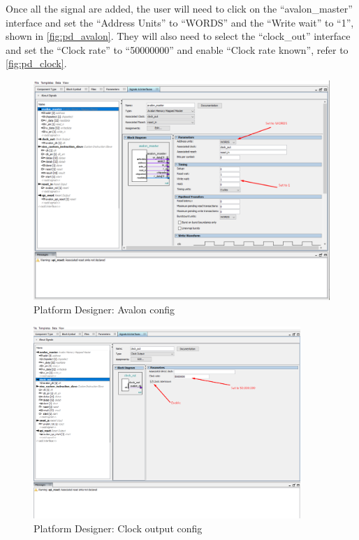 Once all the signal are added, the user will need to click on the “avalon\_master” interface and set the “Address Units” to “WORDS” and the “Write wait” to “1”, shown in \autoref{fig:pd_avalon}. They will also need to select the “clock\_out” interface and set the “Clock rate” to “50000000” and enable “Clock rate known”, refer to \autoref{fig:pd_clock}.

\begin{figure}[!htb]
    \centering
    \includegraphics[width=1\textwidth]{05_evaluation/images/pd_avalon_config.png}
    \caption{Platform Designer: Avalon config}
    \label{fig:pd_avalon}
\end{figure}


\begin{figure}[!htb]
    \centering
    \includegraphics[width=0.9\textwidth]{05_evaluation/images/pd_clock.png}
    \caption{Platform Designer: Clock output config}
    \label{fig:pd_clock}
\end{figure}

